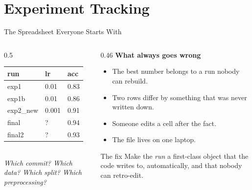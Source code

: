 \section{Experiment Tracking}

\begin{frame}{The Spreadsheet Everyone Starts With}

    \centering
    \begin{columns}[T]
        \begin{column}{0.5\textwidth}
            \begin{tcolorbox}[colback=red!5, colframe=red!50, title=\small \texttt{results\_final\_v3\_REAL.xlsx}]
                \scriptsize
                \begin{tabular}{lll}
                    \textbf{run} & \textbf{lr} & \textbf{acc} \\
                    \hline
                    exp1        & 0.01  & 0.83 \\
                    exp1b       & 0.01  & 0.86 \\
                    exp2\_new   & 0.001 & 0.91 \\
                    final       & ?     & 0.94 \\
                    final2      & ?     & 0.93 \\
                \end{tabular}
                \vspace{0.5em}
                \\ \textit{Which commit? Which data? Which split? Which preprocessing?}
            \end{tcolorbox}
        \end{column}
        \begin{column}{0.46\textwidth}
            \small
            \textbf{What always goes wrong}
            \begin{itemize}
                \item The best number belongs to a run nobody can rebuild.
                \item Two rows differ by something that was never written down.
                \item Someone edits a cell after the fact.
                \item The file lives on one laptop.
            \end{itemize}
            \vspace{0.5em}
            \begin{block}{\small The fix}
                \small Make the \emph{run} a first-class object that the code writes to, automatically, and
                that nobody can retro-edit.
            \end{block}
        \end{column}
    \end{columns}

\end{frame}
